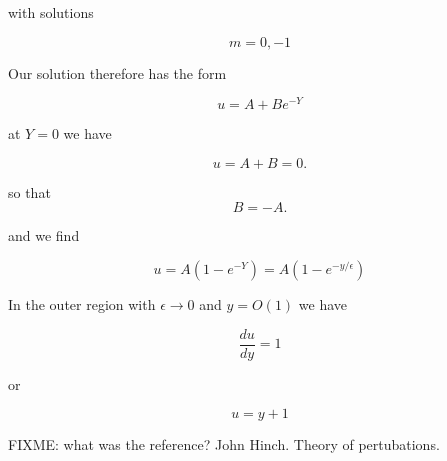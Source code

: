 with solutions

\begin{equation}\label{eqn:continuumL20:n}
m = 0, -1
\end{equation}

Our solution therefore has the form

\begin{equation}\label{eqn:continuumL20:n}
u = A + B e^{-Y}
\end{equation}

at $Y = 0$ we have

\begin{equation}\label{eqn:continuumL20:n}
u = A + B = 0.
\end{equation}

so that 
\begin{equation}\label{eqn:continuumL20:n}
B = -A.
\end{equation}

and we find

\begin{equation}\label{eqn:continuumL20:n}
u = A (1 - e^{-Y}) = A( 1 - e^{-y/\epsilon} )
\end{equation}

In the outer region with $\epsilon \rightarrow 0$ and $y = O(1)$ we have

\begin{equation}\label{eqn:continuumL20:n}
\frac{du}{dy} = 1
\end{equation}

or 

\begin{equation}\label{eqn:continuumL20:n}
u = y + 1
\end{equation}

%
%

FIXME: what was the reference? John Hinch.  Theory of pertubations.

\EndNoBibArticle
